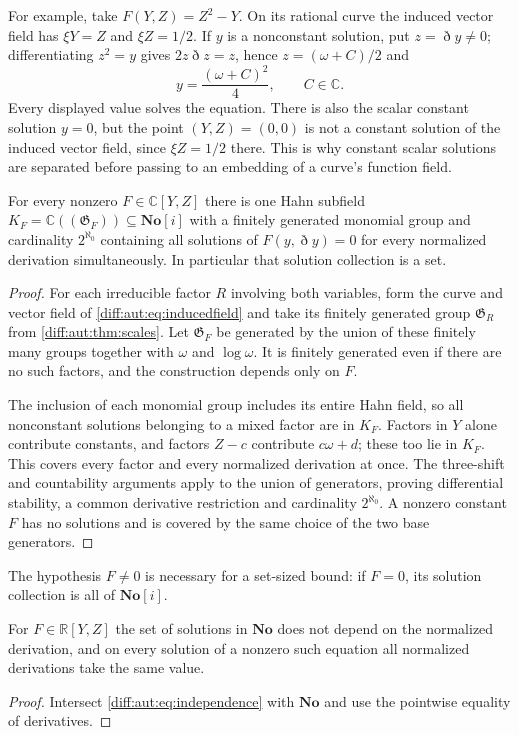 \documentclass[11pt,letterpaper]{article}
\numberwithin{equation}{section}
\theoremstyle{definition}
\theoremstyle{remark}
\newcommand{\No}{\mathbf{No}}
\newcommand{\SC}{\mathbf{No}[i]}
\newcommand{\R}{\mathbb R}
\newcommand{\C}{\mathbb C}
\newcommand{\Dn}{\eth}
\begin{document}
For example, take $F(Y,Z)=Z^2-Y$. On its rational curve the induced
vector field has $\xi Y=Z$ and $\xi Z=1/2$. If $y$ is a nonconstant
solution, put $z=\Dn y\neq0$; differentiating $z^2=y$ gives
$2z\Dn z=z$, hence $z=(\omega+C)/2$ and
\[
 y=\frac{(\omega+C)^2}{4},\qquad C\in\C.
\]
Every displayed value solves the equation. There is also the scalar
constant solution $y=0$, but the point $(Y,Z)=(0,0)$ is not a
constant solution of the induced vector field, since $\xi Z=1/2$
there. This is why constant scalar solutions are separated before
passing to an embedding of a curve's function field.


\begin{corollary}
\label{diff:aut:cor:scalarbound}
For every nonzero $F\in\C[Y,Z]$ there is one Hahn subfield
$K_{F}=\C((\mathfrak G_{F}))\subseteq\SC$ with a finitely generated monomial group
and cardinality $2^{\aleph_{0}}$ containing all solutions of $F(y,\Dn y)=0$ for
every normalized derivation simultaneously. In particular that solution
collection is a set.
\end{corollary}
\begin{proof}
For each irreducible factor $R$ involving both variables, form the
curve and vector field of \cref{diff:aut:eq:inducedfield} and take
its finitely generated group $\mathfrak G_R$ from
\cref{diff:aut:thm:scales}. Let $\mathfrak G_F$ be generated by the
union of these finitely many groups together with $\omega$ and
$\log\omega$. It is finitely generated even if there are no such
factors, and the construction depends only on $F$.

The inclusion of each monomial group includes its entire Hahn field,
so all nonconstant solutions belonging to a mixed factor are in
$K_F$. Factors in $Y$ alone contribute constants, and factors
$Z-c$ contribute $c\omega+d$; these too lie in $K_F$.
This covers every factor and every normalized derivation at once.
The three-shift and countability arguments apply to the union of
generators, proving differential stability, a common derivative
restriction and cardinality $2^{\aleph_0}$. A nonzero constant
$F$ has no solutions and is covered by the same choice of the
two base generators.
\end{proof}

The hypothesis $F\neq0$ is necessary for a set-sized bound: if
$F=0$, its solution collection is all of $\SC$.


\begin{corollary}
\label{diff:aut:cor:realindep}
For $F\in\R[Y,Z]$ the set of solutions in $\No$ does not depend on the
normalized derivation, and on every solution of a nonzero such equation all
normalized derivations take the same value.
\end{corollary}
\begin{proof}
Intersect \cref{diff:aut:eq:independence} with $\No$ and use the pointwise
equality of derivatives.
\end{proof}
\end{document}

